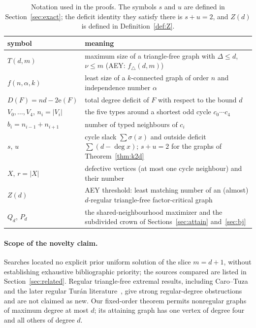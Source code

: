 \documentclass[11pt]{article}
\theoremstyle{remark}
\newcommand{\e}{\mathrm{e}}
\begin{document}
\begin{table}[ht]
\centering\small
\begin{tabular}{lp{}}
\toprule
symbol & meaning \\
\midrule
$T(d,m)$ & maximum size of a triangle-free graph with $\Delta\le d$, $\nu\le m$ (AEY: $f_\triangle(d,m)$) \\
$f(n,\alpha,k)$ & least size of a $k$-connected graph of order $n$ and independence number $\alpha$ \\
$D(F)=nd-2\e(F)$ & total degree deficit of $F$ with respect to the bound $d$ \\
$V_0,\ldots,V_4$, $n_i=|V_i|$ & the five types around a shortest odd cycle $c_0\cdots c_4$ \\
$b_i=n_{i-1}+n_{i+1}$ & number of typed neighbours of $c_i$ \\
$s$, $u$ & cycle slack $\sum\sigma(x)$ and outside deficit $\sum(d-\deg x)$; $s+u=2$ for the graphs of Theorem~\ref{thm:k2d} \\
$X$, $r=|X|$ & defective vertices (at most one cycle neighbour) and their number \\
$Z(d)$ & AEY threshold: least matching number of an (almost) $d$-regular triangle-free factor-critical graph \\
$Q_d$, $P_d$ & the shared-neighbourhood maximizer and the subdivided crown of Sections~\ref{sec:attain} and~\ref{sec:bj} \\
\bottomrule
\end{tabular}
\caption{Notation used in the proofs. The symbols $s$ and $u$ are defined in Section~\ref{sec:exact}; the deficit identity they satisfy there is $s+u=2$, and $Z(d)$ is defined in Definition~\ref{def:Z}.}
\label{tab:notation}
\end{table}

\paragraph{Scope of the novelty claim.}

Searches located no explicit prior uniform solution of the slice $m=d+1$, without establishing exhaustive bibliographic priority; the sources compared are listed in Section~\ref{sec:related}. Regular triangle-free extremal results, including Caro--Tuza~\cite[Theorem 2(iii)]{CT} and the later regular Tur\'an literature~\cite{CDK}, give strong regular-degree obstructions and are not claimed as new. Our fixed-order theorem permits nonregular graphs of maximum degree at most $d$; its attaining graph has one vertex of degree four and all others of degree $d$.
\end{document}
